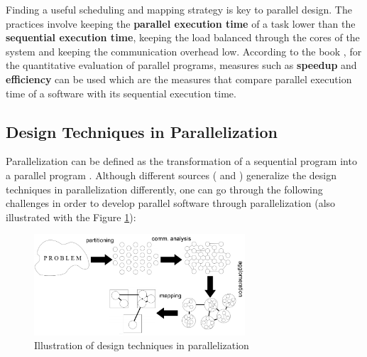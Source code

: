 Finding a useful scheduling and mapping strategy is key to parallel design. The practices involve keeping the \textbf{parallel execution time} of a task lower than the \textbf{sequential execution time}, keeping the load balanced through the cores of the system and keeping the communication overhead low. According to the book \cite{springerparallel}, for the quantitative evaluation of parallel programs, measures such as \textbf{speedup} and \textbf{efficiency} can be used which are the measures that compare parallel execution time of a software with its sequential execution time.

\subsection{Design Techniques in Parallelization} \label{designtech}

Parallelization can be defined as the transformation of a sequential program into a parallel program \cite{springerparallel}. Although different sources (\cite{springerparallel} and \cite{lukas1}) generalize the design techniques in parallelization differently, one can go through the following challenges in order to develop parallel software through parallelization (also illustrated with the Figure \ref{fig:designtechniques}):
\begin{figure}[!ht]
	\centering
	\includegraphics[width=0.7\textwidth]{content/images/designtechniques.png}
	\caption{Illustration of design techniques in parallelization \cite{lukas1}}
	\label{fig:designtechniques}
\end{figure}

